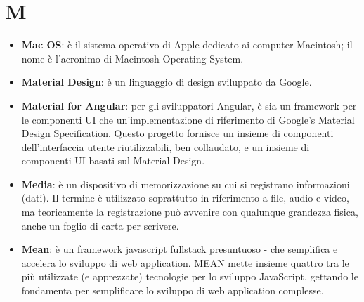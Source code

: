 \section{M}
\begin{itemize} 
	\item
	\textbf{Mac OS}: è il sistema operativo di Apple dedicato ai computer Macintosh; il nome è l'acronimo di Macintosh Operating System.
	\item
	\textbf{Material Design}: è un linguaggio di design sviluppato da Google.
	\item
	\textbf{Material for Angular}: per gli sviluppatori Angular, è sia un framework per le componenti UI che un'implementazione di riferimento di Google's Material Design Specification. Questo progetto fornisce un insieme di componenti dell'interfaccia utente riutilizzabili, ben collaudato, e un insieme di componenti UI basati sul Material Design.
	\item
	\textbf{Media}: è un dispositivo di memorizzazione su cui si registrano informazioni (dati). Il termine è utilizzato soprattutto in riferimento a file, audio e video, ma teoricamente la registrazione può avvenire con qualunque grandezza fisica, anche un foglio di carta per scrivere.
	\item
	\textbf{Mean}: è un framework javascript fullstack presuntuoso - che semplifica e accelera lo sviluppo di web application. MEAN mette insieme quattro tra le più utilizzate (e apprezzate) tecnologie per lo sviluppo JavaScript, gettando le fondamenta per semplificare lo sviluppo di web application complesse.
	

\end{itemize}
